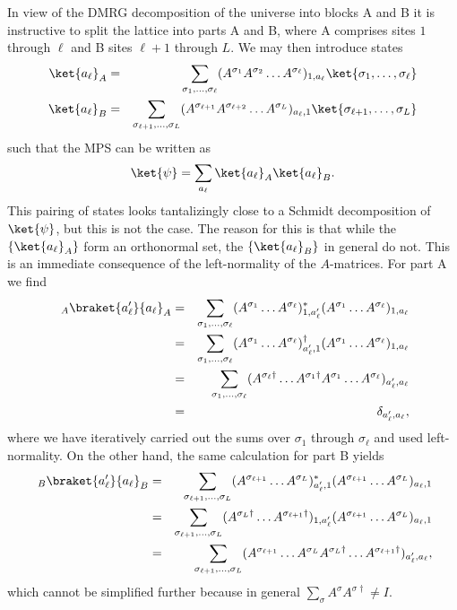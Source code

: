 In view of the DMRG decomposition of the universe into blocks A and B it is instructive to split the lattice into parts A and B, where A comprises sites $1$ through $\ell$ and B sites $\ell+1$ through $L$. We may then introduce states
\begin{eqnarray}
\ket{a_\ell}_A &=& \sum_{\sigma_1,\ldots,\sigma_\ell} (A^{\sigma_1} A^{\sigma_2} \ldots A^{\sigma_\ell})_{1,a_\ell} \ket{\sigma_1,\ldots,\sigma_\ell} \\
\ket{a_\ell}_B &=& \sum_{\sigma_{\ell+1},\ldots,\sigma_L} (A^{\sigma_{\ell+1}} A^{\sigma_{\ell+2}} \ldots A^{\sigma_L})_{a_\ell,1} \ket{\sigma_{\ell+1},\ldots,\sigma_L}
\end{eqnarray}
such that the MPS can be written as
\begin{equation}
\ket{\psi} = \sum_{a_\ell} \ket{a_\ell}_A \ket{a_\ell}_B . 
\end{equation}
This pairing of states looks tantalizingly close to a Schmidt decomposition of $\ket{\psi}$, but this is not the case. The reason for this is that while the $\{ \ket{a_\ell}_A \}$ form an orthonormal set, the $\{ \ket{a_\ell}_B \}$ in general do not. This is an immediate consequence of the left-normality of the $A$-matrices. For part A we find 
\begin{eqnarray*}
\phantom\langle_A \braket{a'_\ell}{a_\ell}_A &=& \sum_{\sigma_1,\ldots,\sigma_\ell} (A^{\sigma_1} \ldots A^{\sigma_\ell})^*_{1,a'_\ell} (A^{\sigma_1} \ldots A^{\sigma_\ell})_{1,a_\ell} \\
&=& \sum_{\sigma_1,\ldots,\sigma_\ell} (A^{\sigma_1} \ldots A^{\sigma_\ell})^\dagger_{a'_\ell,1} (A^{\sigma_1} \ldots A^{\sigma_\ell})_{1,a_\ell} \\
&=& \sum_{\sigma_1,\ldots,\sigma_\ell} (A^{\sigma_\ell\dagger} \ldots A^{\sigma_1\dagger}A^{\sigma_1} \ldots A^{\sigma_\ell})_{a'_\ell,a_\ell} \\
&=& \delta_{a'_\ell,a_\ell} ,
\end{eqnarray*}
where we have iteratively carried out the sums over $\sigma_1$ through $\sigma_\ell$ and used left-normality. On the other hand, the same calculation for part B yields
\begin{eqnarray*}
\phantom\langle_B \braket{a'_\ell}{a_\ell}_B &=& \sum_{\sigma_{\ell+1},\ldots,\sigma_L} (A^{\sigma_{\ell+1}} \ldots A^{\sigma_L})^*_{a'_\ell,1} (A^{\sigma_{\ell+1}} \ldots A^{\sigma_L})_{a_\ell,1} \\
&=& \sum_{\sigma_{\ell+1},\ldots,\sigma_L} (A^{\sigma_L\dagger} \ldots A^{\sigma_{\ell+1}\dagger})_{1,a'_\ell} (A^{\sigma_{\ell+1}} \ldots A^{\sigma_L})_{a_\ell,1} \\
&=& \sum_{\sigma_{\ell+1},\ldots,\sigma_L} (A^{\sigma_{\ell+1}} \ldots A^{\sigma_L}A^{\sigma_L\dagger} \ldots A^{\sigma_{\ell+1}\dagger})_{a'_\ell,a_\ell},
\end{eqnarray*}
which cannot be simplified further because in general $\sum_\sigma A^\sigma A^{\sigma\dagger} \neq I$.

